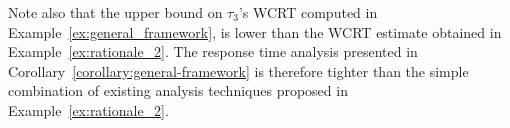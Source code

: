 Note also that the upper bound on $\tau_3$'s WCRT computed in Example~\ref{ex:general_framework}, is lower than the WCRT estimate obtained in Example~\ref{ex:rationale_2}. The response time analysis presented in Corollary~\ref{corollary:general-framework} is therefore tighter than the simple combination of existing analysis techniques proposed in Example~\ref{ex:rationale_2}.






